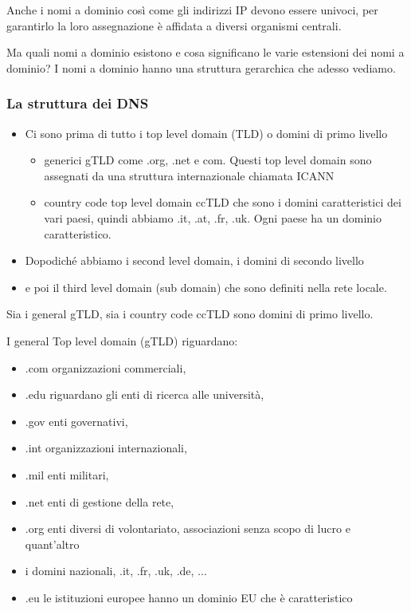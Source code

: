 Anche i nomi a dominio così come gli indirizzi IP devono essere univoci, per garantirlo la loro assegnazione è affidata a diversi organismi centrali.

Ma quali nomi a dominio esistono e cosa significano le varie estensioni dei nomi a dominio? I nomi a dominio hanno una struttura gerarchica che adesso vediamo.

\subsubsection{La struttura dei DNS}

\begin{itemize}
    \item Ci sono prima di tutto i top level domain (TLD) o domini di primo livello
          \begin{itemize}
              \item generici gTLD come .org, .net e com. Questi top level domain sono assegnati da una struttura internazionale chiamata ICANN
              \item country code top level domain ccTLD che sono i domini caratteristici dei vari paesi, quindi abbiamo .it, .at, .fr, .uk. Ogni paese ha un dominio caratteristico.
          \end{itemize}
    \item Dopodiché abbiamo i second level domain, i domini di secondo livello
    \item e poi il third level domain (sub domain) che sono definiti nella rete locale.
\end{itemize}

Sia i general gTLD, sia i country code ccTLD sono domini di primo livello. \par

I general Top level domain (gTLD) riguardano:
\begin{itemize}
    \item .com organizzazioni commerciali,
    \item .edu riguardano gli enti di ricerca alle università,
    \item .gov enti governativi,
    \item .int organizzazioni internazionali,
    \item .mil enti militari,
    \item .net enti di gestione della rete,
    \item .org enti diversi di volontariato, associazioni senza scopo di lucro e quant'altro
    \item i domini nazionali, .it, .fr, .uk, .de, ...
    \item .eu le istituzioni europee hanno un dominio EU che è caratteristico
\end{itemize}

